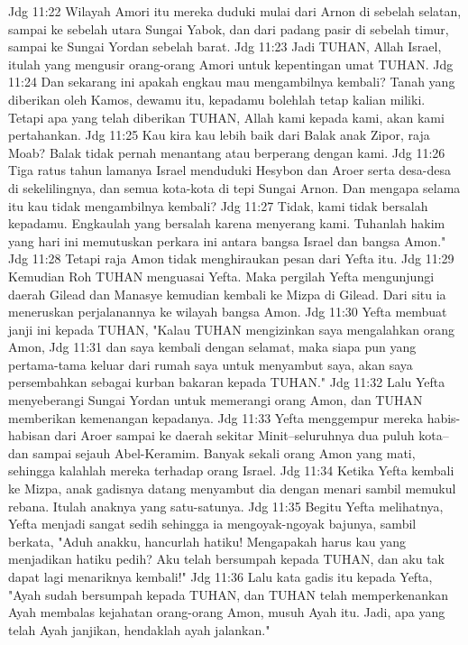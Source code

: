 Jdg 11:22  Wilayah Amori itu mereka duduki mulai dari Arnon di sebelah selatan, sampai ke sebelah utara Sungai Yabok, dan dari padang pasir di sebelah timur, sampai ke Sungai Yordan sebelah barat.
Jdg 11:23  Jadi TUHAN, Allah Israel, itulah yang mengusir orang-orang Amori untuk kepentingan umat TUHAN.
Jdg 11:24  Dan sekarang ini apakah engkau mau mengambilnya kembali? Tanah yang diberikan oleh Kamos, dewamu itu, kepadamu bolehlah tetap kalian miliki. Tetapi apa yang telah diberikan TUHAN, Allah kami kepada kami, akan kami pertahankan.
Jdg 11:25  Kau kira kau lebih baik dari Balak anak Zipor, raja Moab? Balak tidak pernah menantang atau berperang dengan kami.
Jdg 11:26  Tiga ratus tahun lamanya Israel menduduki Hesybon dan Aroer serta desa-desa di sekelilingnya, dan semua kota-kota di tepi Sungai Arnon. Dan mengapa selama itu kau tidak mengambilnya kembali?
Jdg 11:27  Tidak, kami tidak bersalah kepadamu. Engkaulah yang bersalah karena menyerang kami. Tuhanlah hakim yang hari ini memutuskan perkara ini antara bangsa Israel dan bangsa Amon."
Jdg 11:28  Tetapi raja Amon tidak menghiraukan pesan dari Yefta itu.
Jdg 11:29  Kemudian Roh TUHAN menguasai Yefta. Maka pergilah Yefta mengunjungi daerah Gilead dan Manasye kemudian kembali ke Mizpa di Gilead. Dari situ ia meneruskan perjalanannya ke wilayah bangsa Amon.
Jdg 11:30  Yefta membuat janji ini kepada TUHAN, "Kalau TUHAN mengizinkan saya mengalahkan orang Amon,
Jdg 11:31  dan saya kembali dengan selamat, maka siapa pun yang pertama-tama keluar dari rumah saya untuk menyambut saya, akan saya persembahkan sebagai kurban bakaran kepada TUHAN."
Jdg 11:32  Lalu Yefta menyeberangi Sungai Yordan untuk memerangi orang Amon, dan TUHAN memberikan kemenangan kepadanya.
Jdg 11:33  Yefta menggempur mereka habis-habisan dari Aroer sampai ke daerah sekitar Minit--seluruhnya dua puluh kota--dan sampai sejauh Abel-Keramim. Banyak sekali orang Amon yang mati, sehingga kalahlah mereka terhadap orang Israel.
Jdg 11:34  Ketika Yefta kembali ke Mizpa, anak gadisnya datang menyambut dia dengan menari sambil memukul rebana. Itulah anaknya yang satu-satunya.
Jdg 11:35  Begitu Yefta melihatnya, Yefta menjadi sangat sedih sehingga ia mengoyak-ngoyak bajunya, sambil berkata, "Aduh anakku, hancurlah hatiku! Mengapakah harus kau yang menjadikan hatiku pedih? Aku telah bersumpah kepada TUHAN, dan aku tak dapat lagi menariknya kembali!"
Jdg 11:36  Lalu kata gadis itu kepada Yefta, "Ayah sudah bersumpah kepada TUHAN, dan TUHAN telah memperkenankan Ayah membalas kejahatan orang-orang Amon, musuh Ayah itu. Jadi, apa yang telah Ayah janjikan, hendaklah ayah jalankan."
